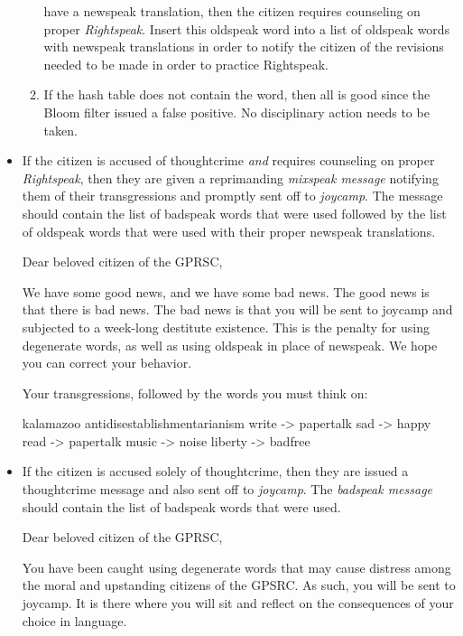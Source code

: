 \begin{itemize}
\begin{enumerate}
        have a newspeak translation, then the citizen requires
        counseling on proper \emph{Rightspeak}. Insert this oldspeak
        word into a list of oldspeak words with newspeak translations in
        order to notify the citizen of the revisions needed to be made
        in order to practice Rightspeak.
      \item If the hash table does not contain the word, then all is
        good since the Bloom filter issued a false positive. No
        disciplinary action needs to be taken.
    \end{enumerate}
  \item If the citizen is accused of thoughtcrime \emph{and} requires
    counseling on proper \emph{Rightspeak}, then they are given a
    reprimanding \emph{mixspeak message} notifying them of their
    transgressions and promptly sent off to \emph{joycamp}. The message
    should contain the list of badspeak words that were used followed by
    the list of oldspeak words that were used with their proper newspeak
    translations.

  \begin{shlisting}{}
Dear beloved citizen of the GPRSC,

We have some good news, and we have some bad news.
The good news is that there is bad news. The bad news is that you will
be sent to joycamp and subjected to a week-long destitute existence.
This is the penalty for using degenerate words, as well as using
oldspeak in place of newspeak. We hope you can correct your behavior.

Your transgressions, followed by the words you must think on:

kalamazoo
antidisestablishmentarianism
write -> papertalk
sad -> happy
read -> papertalk
music -> noise
liberty -> badfree\end{shlisting}

  \item If the citizen is accused solely of thoughtcrime, then they are
    issued a thoughtcrime message and also sent off to \emph{joycamp}.
    The \emph{badspeak message} should contain the list of badspeak
    words that were used.

  \begin{shlisting}{}
Dear beloved citizen of the GPRSC,

You have been caught using degenerate words that may cause
distress among the moral and upstanding citizens of the GPSRC.
As such, you will be sent to joycamp. It is there where you will
sit and reflect on the consequences of your choice in language.


\end{shlisting}
\end{itemize}
